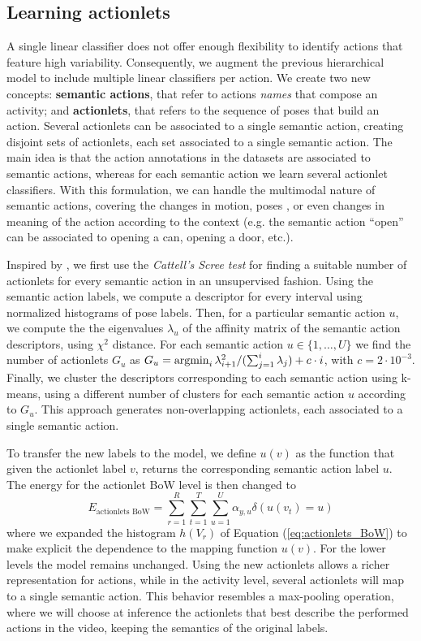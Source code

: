 \subsection{Learning actionlets}
A single linear classifier does not offer enough flexibility to identify 
actions that feature high variability. Consequently, we augment the previous 
hierarchical model to include multiple linear classifiers per action. We create 
two new concepts: \textbf{semantic actions}, that refer to actions \emph{names} 
that compose an activity; and \textbf{actionlets}, that refers to the 
sequence of poses that build an action. Several actionlets can be 
associated to a single semantic action, creating disjoint sets of actionlets, each set associated to a single semantic action.  The main idea is 
that the action annotations in the datasets are associated to semantic actions, 
whereas for each semantic action we learn several actionlet classifiers. 
With this formulation, we can handle the multimodal nature of semantic actions, 
covering the changes in motion, poses , or even changes in meaning of the action 
according to the context (e.g. the semantic action ``open'' can be associated to 
opening a can, opening a door, etc.). 

Inspired by \cite{Raptis2012}, we first use the \emph{Cattell's Scree test} for 
finding a suitable number of actionlets for every semantic action in an unsupervised fashion. Using 
the semantic action labels, we compute a descriptor for every interval using 
normalized histograms of pose labels. Then, for a particular semantic action 
$u$, we compute the the eigenvalues $\lambda_u$ of the affinity matrix of the 
semantic action descriptors, using $\chi^2$ distance. For each semantic action 
$u \in \{1,\dots,U\}$ we find the number of actionlets $G_u$ as $G_u = 
\operatorname*{argmin}_i \lambda_{i+1}^2 / (\sum_{j=1}^i \lambda_j) + c\cdot i$, with $c=2\cdot 
10^{-3}$. Finally, we cluster the descriptors corresponding to each semantic 
action using k-means, using a different number of clusters for each semantic 
action $u$ according to $G_u$. This approach generates non-overlapping actionlets, each associated to a single semantic action.

To transfer the new labels to the model, we define $u(v)$ as the function that 
given the actionlet label $v$, returns the corresponding semantic action 
label $u$. The energy for the actionlet BoW level is then changed to
\begin{equation}
E_{\text{actionlets BoW}} =  \sum_{r=1}^R\sum_{t=1}^T\sum_{u=1}^U \alpha_{y,u}\delta(u(v_t)=u)
\end{equation}  
where we expanded the histogram $h(V_r)$ of Equation (\ref{eq:actionlets_BoW}) to make explicit the dependence to the mapping function $u(v)$.
For the lower levels the model remains unchanged. Using the new actionlets allows a richer representation for actions, while in the activity 
level, several actionlets will map to a single semantic action. This 
behavior resembles a max-pooling operation, where we will choose at inference 
the actionlets that best describe the performed actions in the video, 
keeping the semantics of the original labels. 

